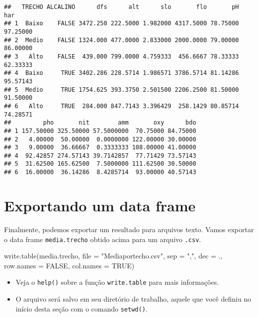 \documentclass[
]{book}
\newenvironment{Shaded}{\begin{snugshade}}{\end{snugshade}}
\newcommand{\AttributeTok}[1]{\textcolor[rgb]{0.77,0.63,0.00}{#1}}
\newcommand{\ConstantTok}[1]{\textcolor[rgb]{0.00,0.00,0.00}{#1}}
\newcommand{\FunctionTok}[1]{\textcolor[rgb]{0.00,0.00,0.00}{#1}}
\newcommand{\NormalTok}[1]{#1}
\newcommand{\StringTok}[1]{\textcolor[rgb]{0.31,0.60,0.02}{#1}}
\providecommand{\tightlist}{%
  \setlength{\itemsep}{0pt}\setlength{\parskip}{0pt}}
\begin{document}
\begin{verbatim}
##   TRECHO ALCALINO      dfs      alt      slo       flo       pH      har
## 1  Baixo    FALSE 3472.250 222.5000 1.982000 4317.5000 78.75000 97.25000
## 2  Medio    FALSE 1324.000 477.0000 2.833000 2000.0000 79.00000 86.00000
## 3   Alto    FALSE  439.000 799.0000 4.759333  456.6667 78.33333 62.33333
## 4  Baixo     TRUE 3402.286 228.5714 1.986571 3786.5714 81.14286 95.57143
## 5  Medio     TRUE 1754.625 393.3750 2.501500 2206.2500 81.50000 91.50000
## 6   Alto     TRUE  284.000 847.7143 3.396429  258.1429 80.85714 74.28571
##         pho       nit        amm       oxy      bdo
## 1 157.50000 325.50000 57.5000000  70.75000 84.75000
## 2   4.00000  50.00000  0.0000000 122.00000 30.00000
## 3   9.00000  36.66667  0.3333333 108.00000 41.00000
## 4  92.42857 274.57143 39.7142857  77.71429 73.57143
## 5  31.62500 165.62500  7.5000000 111.62500 30.50000
## 6  16.00000  36.14286  8.4285714  93.00000 40.57143
\end{verbatim}

\hypertarget{exportando-um-data-frame}{%
\section{Exportando um data frame}\label{exportando-um-data-frame}}

Finalmente, podemos exportar um resultado para arquivos texto. Vamos exportar o data frame \texttt{media.trecho} obtido acima para um arquivo \texttt{.csv}.

\begin{Shaded}
\begin{Highlighting}[]
\FunctionTok{write.table}\NormalTok{(media.trecho, }\AttributeTok{file =} \StringTok{"Mediaportecho.csv"}\NormalTok{, }
            \AttributeTok{sep =} \StringTok{","}\NormalTok{, }\AttributeTok{dec =} \StringTok{\textquotesingle{}.\textquotesingle{}}\NormalTok{, }\AttributeTok{row.names =} \ConstantTok{FALSE}\NormalTok{, }
            \AttributeTok{col.names =} \ConstantTok{TRUE}\NormalTok{)}
\end{Highlighting}
\end{Shaded}

\begin{itemize}
\tightlist
\item
  Veja o \texttt{help()} sobre a função \texttt{write.table} para mais informações.
\item
  O arquivo será salvo em seu diretório de trabalho, aquele que você definiu no início desta seção com o comando \texttt{setwd()}.
\end{itemize}
\end{document}

